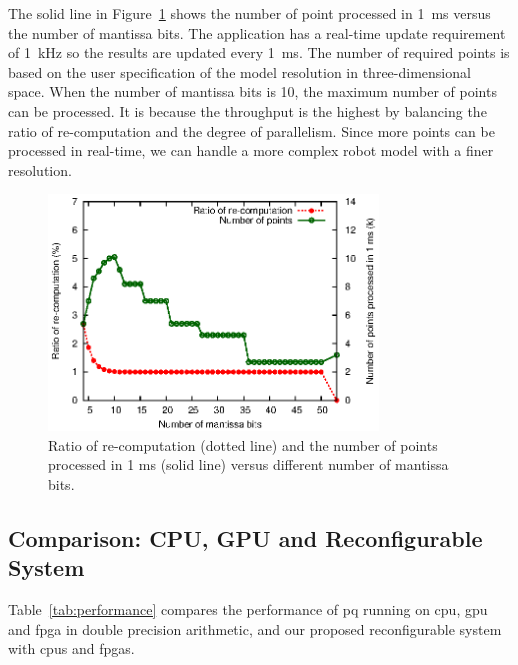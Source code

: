 The solid line in Figure~\ref{fig:recompute} shows the number of point processed in 1~ms versus the number of mantissa bits.
The application has a real-time update requirement of 1~kHz so the results are updated every 1~ms.
The number of required points is based on the user specification of the model resolution in three-dimensional space.
When the number of mantissa bits is 10, the maximum number of points can be processed.
It is because the throughput is the highest by balancing the ratio of re-computation and the degree of parallelism.
Since more points can be processed in real-time, we can handle a more complex robot model with a finer resolution.

\begin{figure}[ht]
\begin{center}
\includegraphics[width=0.78\textwidth]{3_precision/figures/fig_recompute}
\end{center}
\caption[Ratio of re-computation and the number of points processed in 1 ms versus different number of mantissa bits.]{Ratio of re-computation (dotted line) and 
the number of points processed in 1 ms (solid line) versus different number of mantissa bits.}
\label{fig:recompute}
\end{figure}

\subsection{Comparison: CPU, GPU and Reconfigurable System}
Table~\ref{tab:performance} compares the performance of \gls{pq} running on \gls{cpu}, \gls{gpu} and \gls{fpga} in double precision arithmetic, 
and our proposed reconfigurable system with \gls{cpu}s and \gls{fpga}s.


